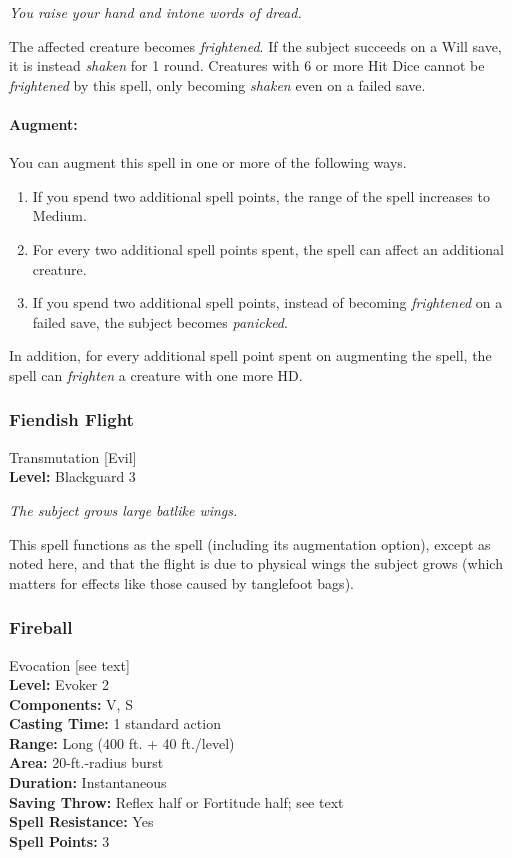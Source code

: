 \emph{You raise your hand and intone words of dread.}

The affected creature becomes \emph{frightened}. 
If the subject succeeds on a Will save, it is instead \emph{shaken} for 1 round. 
Creatures with 6 or more Hit Dice cannot be \emph{frightened} by this spell, only becoming \emph{shaken} even on a failed save.

\paragraph{Augment:} You can augment this spell in one or more of the following ways.
\begin{enumerate}
\item If you spend two additional spell points, the range of the spell increases to Medium.
\item For every two additional spell points spent, the spell can affect an additional creature.
\item If you spend two additional spell points, instead of becoming \emph{frightened} on a failed save, the subject becomes \emph{panicked}.
\end{enumerate}
In addition, for every additional spell point spent on augmenting the spell, the spell can \emph{frighten} a creature with one more HD.
\subsubsection{Fiendish Flight}
\label{Spell:FiendishFlight}
Transmutation [Evil]
\\ \textbf{Level:} Blackguard 3

\emph{The subject grows large batlike wings.}

This spell functions as the  spell (including its augmentation option), except as noted here, and that the flight is due to physical wings the subject grows (which matters for effects like those caused by tanglefoot bags).
\subsubsection{Fireball}
\label{Spell:Fireball}
Evocation [see text]
\\ \textbf{Level:} Evoker 2
\\ \textbf{Components:} V, S
\\ \textbf{Casting Time:} 1 standard action
\\ \textbf{Range:} Long (400 ft. + 40 ft./level)
\\ \textbf{Area:} 20-ft.-radius burst
\\ \textbf{Duration:} Instantaneous
\\ \textbf{Saving Throw:} Reflex half or Fortitude half; see text
\\ \textbf{Spell Resistance:} Yes
\\ \textbf{Spell Points:} 3

